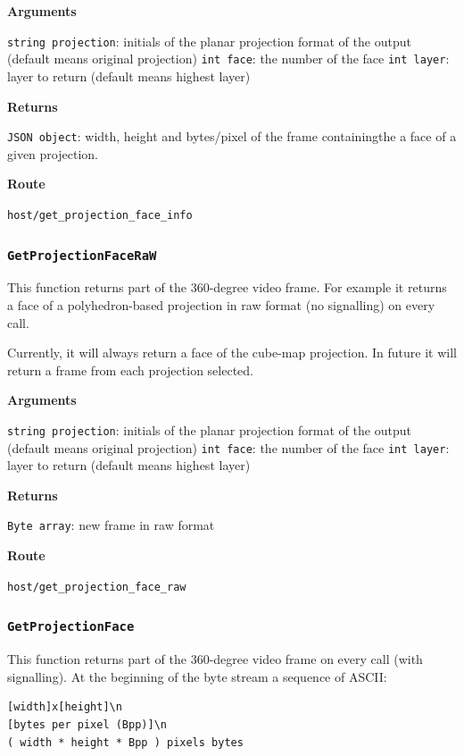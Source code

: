 \documentclass{article}
\begin{document}
\textbf{Arguments}

\texttt{string projection}: initials of the planar projection format of the output (default means original projection)
\texttt{int face}: the number of the face
\texttt{int layer}: layer to return (default means highest layer)

\textbf{Returns}

\texttt{JSON object}:  width, height and bytes/pixel of the frame containingthe a face of a given projection.

\textbf{Route}

\texttt{host/get_projection_face_info}


\subsubsection*{\texttt{GetProjectionFaceRaW}}

This function returns part of the 360-degree video frame.
For example it returns a face of a polyhedron-based projection in raw format (no signalling) on every call.

Currently, it will always return a face of the cube-map projection.
In future it will return a frame from each projection selected.

\textbf{Arguments}

\texttt{string projection}: initials of the planar projection format of the output (default means original projection)
\texttt{int face}: the number of the face
\texttt{int layer}: layer to return (default means highest layer)

\textbf{Returns}

\texttt{Byte array}: new frame in raw format

\textbf{Route}

\texttt{host/get_projection_face_raw}


\subsubsection*{\texttt{GetProjectionFace}}

This function returns part of the 360-degree video frame on every call (with signalling).
At the beginning of the byte stream a sequence of ASCII:
\begin{verbatim}
[width]x[height]\n
[bytes per pixel (Bpp)]\n
( width * height * Bpp ) pixels bytes
\end{verbatim}
\end{document}
